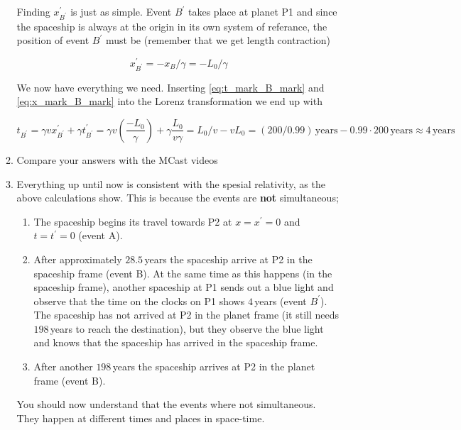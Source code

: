 \documentclass[a4paper,10pt,english]{article}
\begin{document}
\begin{enumerate}
\begin{enumerate}
Finding $x^{\prime}_{B^{\prime}}$ is just as simple. Event $B^{\prime}$ takes place at planet P1 and since the spaceship is always at the origin in its own system of referance, the position of event $B^{\prime}$ must be (remember that we get length contraction)

\begin{equation}\label{eq:x_mark_B_mark}
x^{\prime}_{B^{\prime}}=-x_{B}/\gamma=-L_{0}/\gamma
\end{equation}

We now have everything we need. Inserting \ref{eq:t_mark_B_mark} and \ref{eq:x_mark_B_mark} into the Lorenz transformation we end up with

\begin{equation*}
t_{B^{\prime}}=\gamma vx^{\prime}_{B^{\prime}}+\gamma t^{\prime}_{B^{\prime}}=\gamma v \left(\frac{-L_{0}}{\gamma}\right)+\gamma \frac{L_{0}}{v\gamma}=L_{0}/v-vL_{0}=(200/0.99)\,\text{years}-0.99\cdot200\,\text{years}\approx4\,\text{years}
\end{equation*}

\item Compare your answers with the MCast videos

\item Everything up until now is consistent with the spesial relativity, as the above calculations show. This is because the events are \textbf{not} simultaneous;

\begin{enumerate}
\item The spaceship begins its travel towards P2 at $x=x^{\prime}=0$ and $t=t^{\prime}=0$ (event A).
\item After approximately $28.5\,$years the spaceship arrive at P2 in the spaceship frame (event B). At the same time as this happens (in the spaceship frame), another spaceship at P1 sends out a blue light and observe that the time on the clocks on P1 shows $4\,$years (event $B^{\prime}$). The spaceship has not arrived at P2 in the planet frame (it still needs $198\,$years to reach the destination), but they observe the blue light and knows that the spaceship has arrived in the spaceship frame.
\item After another $198\,$years the spaceship arrives at P2 in the planet frame (event B).
\end{enumerate}
You should now understand that the events where not simultaneous. They happen at different times and places in space-time.

\end{enumerate}


\end{enumerate}
\end{document}
